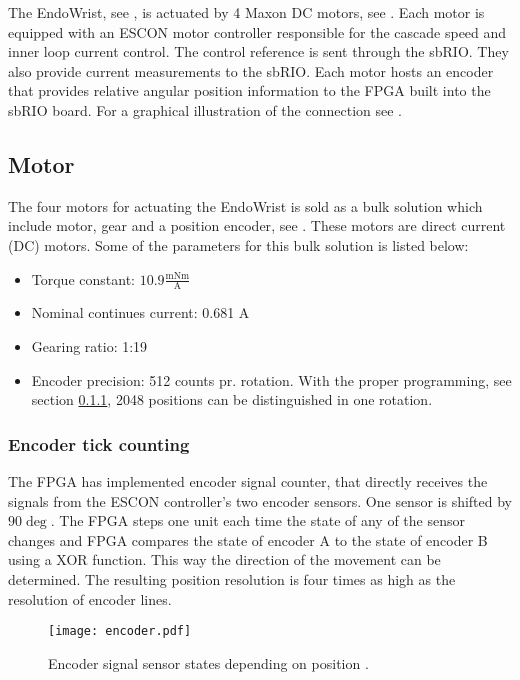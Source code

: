 The EndoWrist, see , is actuated by 4 Maxon DC motors, see . Each motor is equipped with an ESCON motor controller responsible for the cascade speed and inner loop current control. The control reference is sent through the sbRIO. They also provide current measurements to the sbRIO. Each motor hosts an encoder that provides relative angular position information to the FPGA built into the sbRIO board. For a graphical illustration of the connection see .


\subsection{Motor}\label{Maxon_Motor}
The four motors for actuating the EndoWrist is sold as a bulk solution which include motor\cite{motor_motor}, gear\cite{motor_gear} and a position encoder\cite{motor_encoder}, see .
These motors are direct current (DC) motors. Some of the parameters for this bulk solution is listed below:

\begin{itemize}
\item Torque constant: $10.9\frac{\text{mNm}}{\text{A}}$
\item Nominal continues current: 0.681 A 
\item Gearing ratio: 1:19
\item Encoder precision: 512 counts pr. rotation. With the proper programming, see section \ref{encount}, 2048 positions can be distinguished in one rotation.
\end{itemize}

\subsubsection{Encoder tick counting}
\label{encount}
The FPGA has implemented encoder signal counter, that directly receives the signals from  the ESCON controller's two encoder sensors. One sensor is shifted by $90\deg$. The FPGA steps one unit each time the state of any of the sensor changes and FPGA compares the state of encoder A to the state of encoder B using a XOR function. This way the direction of the movement can be determined. The resulting position resolution is four times as high as the resolution of encoder lines.

\begin{figure}[H]
	\centering
	\texttt{[image: encoder.pdf]}
	\caption{Encoder signal sensor states depending on position \cite{motor_encoder}.}
	\label{fig:encoder}
\end{figure}

